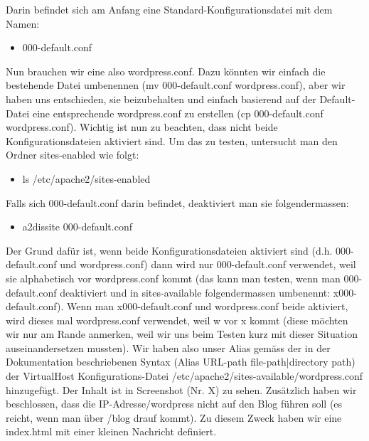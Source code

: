 \documentclass{article}
\begin{document}
	Darin befindet sich am Anfang eine Standard-Konfigurationsdatei mit dem Namen:
	\begin{itemize}
		\item 000-default.conf
	\end{itemize}
	Nun brauchen wir eine also wordpress.conf. Dazu könnten wir einfach die bestehende Datei umbenennen (mv 000-default.conf wordpress.conf), aber wir haben uns entschieden, sie beizubehalten und einfach basierend auf der Default-Datei eine entsprechende wordpress.conf zu erstellen (cp 000-default.conf wordpress.conf). Wichtig ist nun zu beachten, dass nicht beide Konfigurationsdateien aktiviert sind. Um das zu testen, untersucht man den Ordner sites-enabled wie folgt:
	\begin{itemize}
		\item ls /etc/apache2/sites-enabled
	\end{itemize}
	Falls sich  000-default.conf darin befindet, deaktiviert man sie folgendermassen:
	\begin{itemize}
		\item a2dissite  000-default.conf
	\end{itemize}
	Der Grund dafür ist, wenn beide Konfigurationsdateien aktiviert sind (d.h. 000-default.conf und wordpress.conf) dann wird nur 000-default.conf verwendet, weil sie alphabetisch vor wordpress.conf kommt (das kann man testen, wenn man 000-default.conf deaktiviert und in sites-available folgendermassen umbenennt: x000-default.conf). Wenn man x000-default.conf und wordpress.conf beide aktiviert, wird dieses mal wordpress.conf verwendet, weil w vor x kommt (diese möchten wir nur am Rande anmerken, weil wir uns beim Testen kurz mit dieser Situation auseinandersetzen mussten).
	Wir haben also unser Alias gemäss der in der Dokumentation beschriebenen Syntax (Alias URL-path file-path|directory path) der VirtualHost Konfigurations-Datei /etc/apache2/sites-available/wordpress.conf hinzugefügt. Der Inhalt ist in Screenshot (Nr. X) zu sehen. Zusätzlich haben wir beschlossen, dass die IP-Adresse/wordpress nicht auf den Blog führen soll (es reicht, wenn man über /blog drauf kommt). Zu diesem Zweck haben wir eine index.html mit einer kleinen Nachricht definiert.
\end{document}
